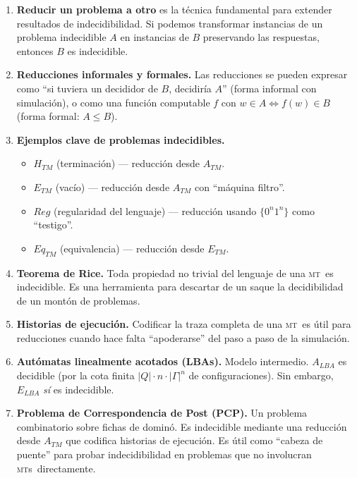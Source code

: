 \documentclass[11pt,a4paper]{article}
\theoremstyle{definicion}
\newcommand{\MT}{\textsc{mt}}
\newcommand{\MTs}{\textsc{mt}s}
\begin{document}
\begin{enumerate}
    \item \textbf{Reducir un problema a otro} es la técnica fundamental para extender resultados de indecidibilidad. Si podemos transformar instancias de un problema indecidible $A$ en instancias de $B$ preservando las respuestas, entonces $B$ es indecidible.

    \item \textbf{Reducciones informales y formales.} Las reducciones se pueden expresar como ``si tuviera un decididor de $B$, decidiría $A$'' (forma informal con simulación), o como una función computable $f$ con $w \in A \iff f(w) \in B$ (forma formal: $A \leq B$).

    \item \textbf{Ejemplos clave de problemas indecidibles.}
    \begin{itemize}
        \item $H_{TM}$ (terminación) --- reducción desde $A_{TM}$.
        \item $E_{TM}$ (vacío) --- reducción desde $A_{TM}$ con ``máquina filtro''.
        \item $Reg$ (regularidad del lenguaje) --- reducción usando $\{0^n 1^n\}$ como ``testigo''.
        \item $Eq_{TM}$ (equivalencia) --- reducción desde $E_{TM}$.
    \end{itemize}

    \item \textbf{Teorema de Rice.} Toda propiedad no trivial del lenguaje de una \MT\ es indecidible. Es una herramienta para descartar de un saque la decidibilidad de un montón de problemas.

    \item \textbf{Historias de ejecución.} Codificar la traza completa de una \MT\ es útil para reducciones cuando hace falta ``apoderarse'' del paso a paso de la simulación.

    \item \textbf{Autómatas linealmente acotados (LBAs).} Modelo intermedio. $A_{LBA}$ es decidible (por la cota finita $|Q| \cdot n \cdot |\Gamma|^n$ de configuraciones). Sin embargo, $E_{LBA}$ \emph{sí} es indecidible.

    \item \textbf{Problema de Correspondencia de Post (PCP).} Un problema combinatorio sobre fichas de dominó. Es indecidible mediante una reducción desde $A_{TM}$ que codifica historias de ejecución. Es útil como ``cabeza de puente'' para probar indecidibilidad en problemas que no involucran \MTs\ directamente.


\end{enumerate}
\end{document}

